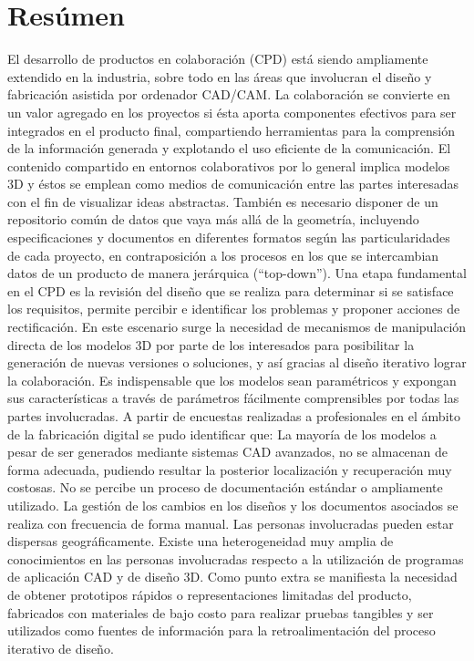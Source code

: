 \chapter*{Resúmen}
El desarrollo de productos en colaboración (CPD) está siendo ampliamente extendido en la industria, sobre todo en las áreas que involucran el diseño y fabricación asistida por ordenador CAD/CAM.
La colaboración se convierte en un valor agregado en los proyectos si ésta aporta componentes efectivos para ser integrados en el producto final, compartiendo herramientas para la comprensión de la información generada y explotando el uso eficiente de la comunicación.
El contenido compartido en entornos colaborativos por lo general implica modelos 3D y éstos se emplean como medios de comunicación entre las partes interesadas con el fin de visualizar ideas abstractas. También es necesario disponer de un repositorio común de datos que vaya más allá de la geometría, incluyendo especificaciones y documentos en diferentes formatos según las particularidades de cada proyecto, en contraposición a los procesos en los que se intercambian datos de un producto de manera jerárquica (“top-down”).
Una etapa fundamental en el CPD es la revisión del diseño que se realiza para determinar si se satisface los requisitos, permite percibir e identificar los problemas y proponer acciones de rectificación. 
En este escenario surge la necesidad de mecanismos de manipulación directa de los modelos 3D por parte de los interesados para posibilitar la generación de nuevas versiones o soluciones, y así gracias al diseño iterativo lograr la colaboración. Es indispensable que los modelos sean paramétricos y expongan sus características a través de parámetros fácilmente comprensibles por todas las partes involucradas.
A partir de encuestas realizadas a profesionales en el ámbito de la fabricación digital se pudo identificar que:
La mayoría de los modelos a pesar de ser generados mediante sistemas CAD avanzados, no se almacenan de forma adecuada, pudiendo resultar la posterior localización y recuperación muy costosas.
No se percibe un proceso de documentación estándar o ampliamente utilizado.
La gestión de los cambios en los diseños y los documentos asociados se realiza con frecuencia de forma manual.
Las personas involucradas pueden estar dispersas geográficamente.
Existe una heterogeneidad muy amplia de conocimientos en las personas involucradas respecto a la utilización de programas de aplicación CAD y de diseño 3D.
Como punto extra se manifiesta la necesidad de obtener prototipos rápidos o representaciones limitadas del producto, fabricados con materiales de bajo costo para realizar pruebas tangibles y ser utilizados como fuentes de información para la retroalimentación del proceso iterativo de diseño. 

